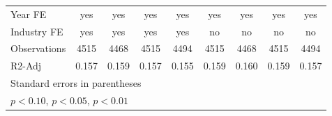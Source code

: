 {\begin{tabular}{l*{8}{c}}
\hline
Year FE             &         yes         &         yes         &         yes         &         yes         &         yes         &         yes         &         yes         &         yes         \\
Industry FE         &         yes         &         yes         &         yes         &         yes         &          no         &          no         &          no         &          no         \\
Observations        &        4515         &        4468         &        4515         &        4494         &        4515         &        4468         &        4515         &        4494         \\
R2-Adj              &       0.157         &       0.159         &       0.157         &       0.155         &       0.159         &       0.160         &       0.159         &       0.157         \\
\hline\hline
\multicolumn{9}{l}{\footnotesize Standard errors in parentheses}\\
\multicolumn{9}{l}{\footnotesize \sym{*} \(p<0.10\), \sym{**} \(p<0.05\), \sym{***} \(p<0.01\)}\\
\end{tabular}
}
